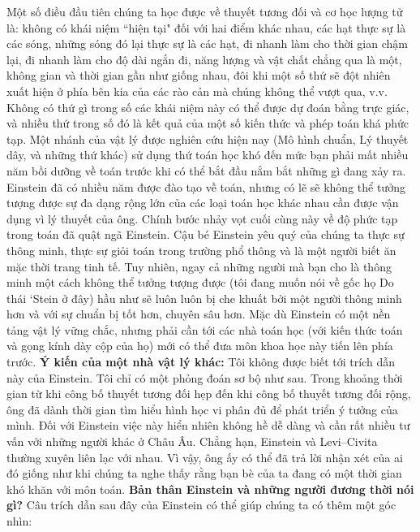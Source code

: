 \begin{multicols}{2}
	\vskip 0.1cm
	Một số điều đầu tiên chúng ta học được về thuyết tương đối và cơ học lượng tử là: không có  khái niệm ``hiện tại" đối với hai điểm khác nhau, các hạt thực sự là các sóng, những sóng đó lại thực sự là các hạt, đi nhanh làm cho thời gian chậm lại, đi nhanh làm cho độ dài ngắn đi, năng lượng và vật chất chẳng qua là một, không gian và thời gian gần như giống nhau, đôi khi một số thứ sẽ đột nhiên xuất hiện ở phía bên kia của các rào cản mà chúng không thể vượt qua,  v.v.
	\vskip 0.1cm
	Không có thứ gì trong số các khái niệm này có thể được dự đoán bằng trực giác, và nhiều thứ trong số đó là kết quả của một số kiến thức và phép toán khá phức tạp.  Một nhánh của vật lý được nghiên cứu hiện nay (Mô hình chuẩn, Lý thuyết dây, và những thứ khác) sử dụng thứ toán học khó đến mức bạn phải mất nhiều năm bồi dưỡng về toán trước khi  có thể bắt đầu nắm bắt những gì đang xảy ra.  Einstein đã có nhiều năm được đào tạo về toán, nhưng có lẽ sẽ không thể tưởng tượng được sự đa dạng rộng lớn của các loại toán học khác nhau cần được vận dụng vì lý thuyết của ông.
	\vskip 0.1cm
	Chính bước nhảy vọt cuối cùng này về độ phức tạp trong toán  đã quật ngã Einstein.  Cậu bé  Einstein yêu quý của chúng ta  thực sự thông minh, thực sự giỏi toán trong trường phổ thông và là một người biết ăn mặc thời trang tinh tế.  Tuy nhiên, ngay cả những người mà bạn cho là thông minh  một cách không thể tưởng tượng được (tôi đang muốn nói về gốc họ Do thái `Stein ở đây) hầu như sẽ luôn luôn bị che khuất bởi một người thông minh hơn và với sự chuẩn bị tốt hơn, chuyên sâu hơn.  Mặc dù Einstein có một nền tảng vật lý vững chắc, nhưng  phải cần tới các nhà toán học (với kiến thức toán và  gọng kính dày cộp của họ) mới có thể  đưa môn khoa học này tiến lên phía trước.
	\vskip 0.1cm
	\textbf{\color{quantoan}Ý kiến của một nhà vật lý khác:} Tôi không được biết  tới trích dẫn này của Einstein. Tôi chỉ có một phỏng đoán sơ bộ như sau. Trong khoảng thời gian từ khi công bố thuyết tương đối hẹp đến khi công bố  thuyết tương đối rộng, ông đã dành thời gian tìm hiểu hình học vi phân đủ để phát triển ý tưởng của mình. Đối với Einstein việc này hiển nhiên không hề dễ dàng  và cần rất nhiều tư vấn với những người khác ở Châu Âu. Chẳng hạn, Einstein và Levi--Civita thường xuyên liên lạc với nhau. Vì vậy, ông ấy có thể đã trả lời nhận xét của ai đó giống như khi chúng ta  nghe  thấy rằng bạn bè của ta đang có một thời gian khó khăn với môn toán.
	\vskip 0.1cm
	\textbf{\color{quantoan}Bản thân Einstein và những người đương thời nói gì?}
	\vskip 0.1cm
	Câu trích dẫn sau đây của Einstein có thể giúp chúng ta có thêm một góc nhìn:

\end{multicols}
